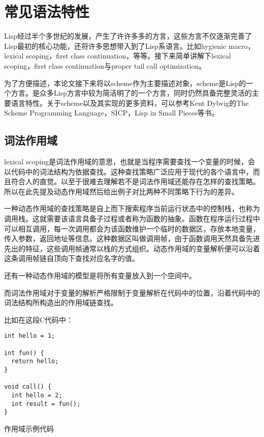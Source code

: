 %
%

\chapter{常见语法特性}

Lisp经过半个多世纪的发展，产生了许许多多的方言，这些方言不仅逐渐完善了Lisp最初的核心功能，还将许多思想带入到了Lisp系语言。比如hygienic macro，lexical scoping，first class continuation，等等。接下来简单讲解下lexical scoping，first class continuation与proper tail call optimization。

为了方便描述，本论文接下来将以scheme作为主要描述对象，scheme是Lisp的一个方言。是众多Lisp方言中较为简洁明了的一个方言，同时仍然具备完整灵活的主要语言特性。关于scheme以及其实现的更多资料，可以参考Kent Dybvig的The Scheme Programming Language\cite{dybvig09scm}，SICP\cite{sicp}，Lisp in Small Pieces\cite{que03}等书。

\section{词法作用域}

lexical scoping是词法作用域的意思，也就是当程序需要查找一个变量的时候，会以代码中的词法结构为依据查找。这种查找策略广泛应用于现代的各个语言中，而且符合人的直觉。以至于很难去理解若不是词法作用域还能存在怎样的查找策略。所以在此先提及动态作用域然后给出例子对比两种不同策略下行为的差异。

一种动态作用域的查找策略是自上而下搜索程序当前运行状态中的控制栈，也称为调用栈。这就需要该语言具备子过程或者称为函数的抽象。函数在程序运行过程中可以相互调用，每一次调用都会为该函数维护一个临时的数据区，存放本地变量，传入参数，返回地址等信息。这种数据区叫做调用帧，由于函数调用天然具备先进先出的特征，这些调用帧通常以栈的方式组织。动态作用域的变量解析便可以沿着这条调用帧链自顶向下查找对应名字的值。

还有一种动态作用域的模型是将所有变量放入到一个空间中。

而词法作用域对于变量的解析严格限制于变量解析在代码中的位置，沿着代码中的词法结构所构造出的作用域链查找。

比如在这段C代码中：

\begin{code}
\begin{verbatim}
int hello = 1;

int fun() {
  return hello;
}

void call() {
  int hello = 2;
  int result = fun();
}
\end{verbatim}
\caption{作用域示例代码}
\end{code}

